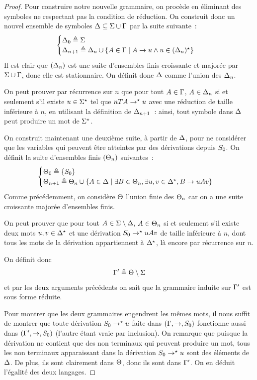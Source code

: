 \begin{proof}
  Pour construire notre nouvelle grammaire, on procède en éliminant des symboles
  ne respectant pas la condition de réduction. On construit donc un nouvel
  ensemble de symboles $\Delta \subseteq \Sigma\cup\Gamma$ par la suite suivante~:
  \[\begin{cases}
  \Delta_0 \triangleq \Sigma \\
  \Delta_{n+1} \triangleq \Delta_n \cup
  \left\{ A \in \Gamma \;\middle\vert\; A \to u \land u \in (\Delta_n)^{\star} \right\}
  \end{cases}\]
  Il est clair que $(\Delta_n)$ est une suite d'ensembles finis croissante et
  majorée par $\Sigma\cup \Gamma$, donc elle est stationnaire. On définit donc
  $\Delta$ comme l'union des $\Delta_n$.

  On peut prouver par récurrence sur $n$ que pour tout $A \in \Gamma$,
  $A \in \Delta_n$ si et seulement s'il existe $u \in \Sigma^{\star}$ tel que
  $nTA \to^{\mathord{\star}} u$ avec une réduction de taille inférieure à $n$, en
  utilisant la définition de $\Delta_{n+1}$~: ainsi, tout symbole dans $\Delta$ peut
  produire un mot de $\Sigma^{\star}$.

  On construit maintenant une deuxième suite, à partir de $\Delta$, pour
  ne considérer que les variables qui peuvent être atteintes par des dérivations
  depuis $S_{0}$. On définit la suite d'ensembles finis $(\Theta_n)$ suivantes~:
  \[\begin{cases}
  \Theta_0 \triangleq \{S_{0}\}\\
  \Theta_{n+1} \triangleq \Theta_n \cup
  \left\{ A \in \Delta \;\middle\vert\; \exists B \in \Theta_n,
  \exists u,v \in \Delta^{\star}, B \to uAv \right\}
  \end{cases}\]
  Comme précédemment, on considère $\Theta$ l'union finie des $\Theta_n$ car on a
  une suite croissante majorée d'ensembles finis.

  On peut prouver que pour tout $A \in \Sigma\setminus\Delta$, $A \in \Theta_n$
  si et seulement s'il existe deux mots $u,v \in \Delta^{\star}$ et une
  dérivation $S_{0} \to^{\mathord{\star}} uAv$ de taille inférieure à $n$,
  dont tous les mots de la dérivation appartiennent à $\Delta^{\star}$, là encore
  par récurrence sur $n$.

  On définit donc
  \[\Gamma' \triangleq \Theta\setminus \Sigma\]
  et par les deux arguments précédents on sait que la grammaire induite sur
  $\Gamma'$ est sous forme réduite.

  Pour montrer que les deux grammaires engendrent les mêmes mots, il nous suffit
  de montrer que toute dérivation $S_{0} \to^{\mathord{\star}} u$ faite dans
  $(\Gamma,\to,S_{0})$ fonctionne aussi dans $(\Gamma',\to,S_{0})$ (l'autre étant
  vraie par inclusion). On remarque que puisque la dérivation ne contient que
  des non terminaux qui peuvent produire un mot, tous les non terminaux
  apparaissant dans la dérivation $S_{0} \to^{\mathord{\star}} u$ sont des éléments
  de $\Delta$. De plus, ils sont clairement dans $\Theta$, donc ils sont dans
  $\Gamma'$. On en déduit l'égalité des deux langages.
\end{proof}


